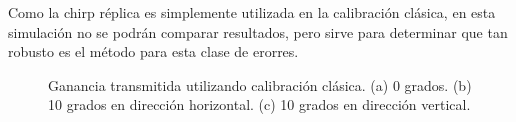 Como la chirp réplica es simplemente utilizada en la calibración clásica, en esta simulación no se podrán comparar 
resultados, pero sirve para determinar que tan robusto es el método para esta clase de erorres.
\begin{figure}[H]
	\centering
 	
		\caption{Ganancia transmitida utilizando calibración clásica. (a) 0 grados. (b) 10 grados en 
		dirección horizontal. (c) 10 grados en dirección vertical.}
	\label{fig:chirpRepErrClassical}
\end{figure}
